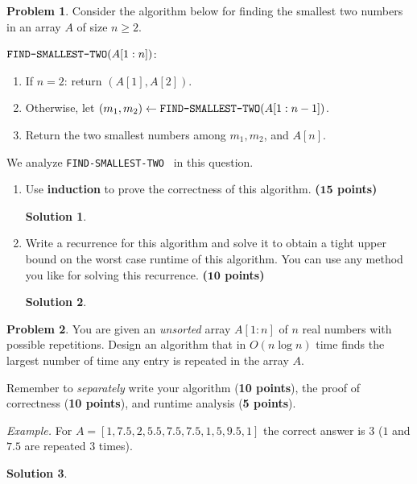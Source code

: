 \documentclass{article}
\theoremstyle{definition}
\newtheorem{problem}{Problem}
\newtheorem*{solution*}{Solution}
\newenvironment{solution}{\begin{solution*}}{{} \end{solution*}}
\newcommand{\grade}[1]{\hfill{\textbf{($\mathbf{#1}$ points)}}}
\newcommand{\leasttwoalg}{\textnormal{\texttt{FIND-SMALLEST-TWO}}}
\begin{document}
\newpage


\begin{problem}\label{induction}
	Consider the algorithm below for finding the smallest two numbers in an array $A$ of size $n \geq 2$.  
	
	\medskip
	
	$\leasttwoalg (A[1:n])$: \vspace{-0.4cm}
	\begin{enumerate}
		\item If $n=2$: return $(A[1],A[2])$.
		
		\item Otherwise, let $(m_1,m_2) \leftarrow \leasttwoalg(A[1:n-1])$. 
		\item Return the two smallest numbers among $m_1,m_2$, and $A[n]$. 
	\end{enumerate}
	We analyze \leasttwoalg~ in this question. 
	\begin{enumerate}[label=(\alph*)]
		\item Use \textbf{induction} to prove the correctness of this algorithm. \grade{15}
		
		\begin{solution}
\end{solution}

		\newpage
		\item Write a recurrence for this algorithm and solve it to obtain a tight upper bound on the worst case runtime of this algorithm. You can use any method you like for solving this recurrence. 		\grade{10}
		
		\begin{solution}
\end{solution}

	\end{enumerate}
\end{problem} 

\newpage

\begin{problem}\label{sort}
	You are given an \emph{unsorted} array $A[1:n]$ of $n$ real numbers with possible repetitions. Design an algorithm that in $O(n\log{n})$ time finds the largest number of time any entry is repeated in the array $A$. 
	
	Remember to \emph{separately} write your algorithm (\textbf{10 points}), the proof of correctness (\textbf{10 points}), and runtime analysis (\textbf{5 points}). 
	
	\medskip
	\emph{Example.} For $A=[1,7.5,2,5.5,7.5,7.5,1,5,9.5,1]$ the correct answer is  $3$ ($1$ and $7.5$ are repeated $3$ times). 

\begin{solution}
\end{solution}

\end{problem}
\end{document}
